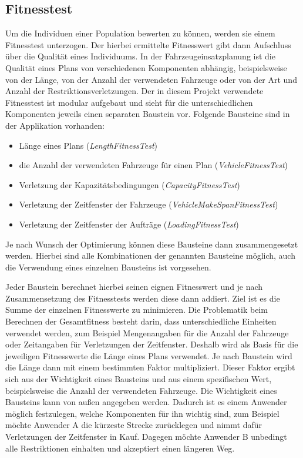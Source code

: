 \subsection{Fitnesstest}
\label{sec:Fitnesstest}
Um die Individuen einer Population bewerten zu können, werden sie einem Fitnesstest unterzogen. Der hierbei ermittelte Fitnesswert gibt dann Aufschluss über die Qualität eines Individuums. In der Fahrzeugeinsatzplanung ist die Qualität eines Plans von verschiedenen Komponenten abhängig, beispielsweise von der Länge, von der Anzahl der verwendeten Fahrzeuge oder von der Art und Anzahl der Restriktionsverletzungen. Der in diesem Projekt verwendete Fitnesstest ist modular aufgebaut und sieht für die unterschiedlichen Komponenten jeweils einen separaten Baustein vor. Folgende Bausteine sind in der Applikation vorhanden:
\begin{itemize}
 \item Länge eines Plans ({\slshape{LengthFitnessTest}})
 \item die Anzahl der verwendeten Fahrzeuge für einen Plan ({\slshape{VehicleFitnessTest}})
 \item Verletzung der Kapazitätsbedingungen ({\slshape{CapacityFitnessTest}})
 \item Verletzung der Zeitfenster der Fahrzeuge ({\slshape{VehicleMakeSpanFitnessTest}})
 \item Verletzung der Zeitfenster der Aufträge ({\slshape{LoadingFitnessTest}})
\end{itemize}
Je nach Wunsch der Optimierung können diese Bausteine dann zusammengesetzt werden. Hierbei sind alle Kombinationen der genannten Bausteine möglich, auch die Verwendung eines einzelnen Bausteins ist vorgesehen.

Jeder Baustein berechnet hierbei seinen eignen Fitnesswert und je nach Zusammensetzung des Fitnesstests werden diese dann addiert. Ziel ist es die Summe der einzelnen Fitnesswerte zu minimieren. Die Problematik beim Berechnen der Gesamtfitness besteht darin, dass unterschiedliche Einheiten verwendet werden, zum Beispiel Mengenangaben für die Anzahl der Fahrzeuge oder Zeitangaben für Verletzungen der Zeitfenster. Deshalb wird als Basis für die jeweiligen Fitnesswerte die Länge eines Plans verwendet. Je nach Baustein wird die Länge dann mit einem bestimmten Faktor multipliziert. Dieser Faktor ergibt sich aus der Wichtigkeit eines Bausteins und aus einem spezifischen Wert, beispielsweise die Anzahl der verwendeten Fahrzeuge. Die Wichtigkeit eines Bausteins kann von außen angegeben werden. Dadurch ist es einem Anwender möglich festzulegen, welche Komponenten für ihn wichtig sind, zum Beispiel möchte Anwender A die kürzeste Strecke zurücklegen und nimmt dafür Verletzungen der Zeitfenster in Kauf. Dagegen möchte Anwender B unbedingt alle Restriktionen einhalten und akzeptiert einen längeren Weg.

